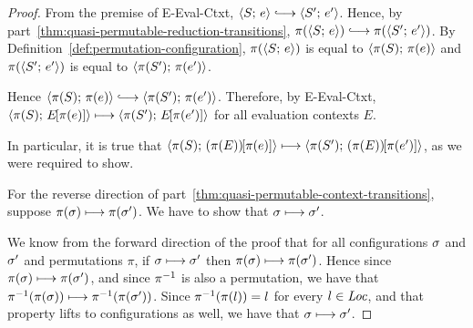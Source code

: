 \begin{proof}
  From the premise of {\sc E-Eval-Ctxt}, $\config{S}{e} \parstepsto
  \config{S'}{e'}$.  Hence, by
  part~\ref{thm:quasi-permutable-reduction-transitions},
  $\pi(\config{S}{e}) \parstepsto \pi(\config{S'}{e'})$.  By
  Definition~\ref{def:permutation-configuration}, $\pi(\langle S;\, e \rangle)$
  is equal to $\langle \pi(S);\, \pi(e) \rangle$ and $\pi(\langle S';\, e' \rangle)$ is
  equal to $\langle \pi(S');\, \pi(e') \rangle$.

  Hence $\config{\pi(S)}{\pi(e)} \parstepsto
  \config{\pi(S')}{\pi(e')}$.  Therefore, by {\sc E-Eval-Ctxt},
  $\langle \pi(S);\, E\hspace{-1mm}\left[\pi(e)\right] \rangle \longmapsto
  \langle \pi(S');\, E\hspace{-1mm}\left[\pi(e')\right] \rangle$ for all evaluation contexts $E$.

  In particular, it is true that
  $\langle \pi(S);\, (\pi(E))\hspace{-1mm}\left[\pi(e)\right] \rangle \longmapsto
  \langle \pi(S');\, (\pi(E))\hspace{-1mm}\left[\pi(e')\right] \rangle$, as we were required
  to show.

  For the reverse direction of
  part~\ref{thm:quasi-permutable-context-transitions}, suppose
  $\pi(\sigma) \longmapsto \pi(\sigma')$.  We have to show that $\sigma
  \longmapsto \sigma'$.

  We know from the forward direction of the proof that for all
  configurations $\sigma$ and $\sigma'$ and permutations $\pi$, if
  $\sigma \longmapsto \sigma'$ then $\pi(\sigma) \longmapsto
  \pi(\sigma')$.  Hence since $\pi(\sigma) \longmapsto \pi(\sigma')$, and
  since $\pi^{-1}$ is also a permutation, we have that
  $\pi^{-1}(\pi(\sigma)) \longmapsto \pi^{-1}(\pi(\sigma'))$.  Since
  $\pi^{-1}(\pi(l)) = l$ for every $l \in \mathit{Loc}$, and that property lifts
  to configurations as well, we have that $\sigma \longmapsto \sigma'$.

\end{proof}
